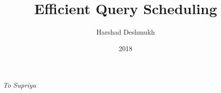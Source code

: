 
\clearpage{}  %

\title{Efficient Query Scheduling}
\author{Harshad Deshmukh}
\date{2018}

\maketitle

\copyrightpage

\begin{dedication}
    \emph{To Supriya}
\end{dedication}

\begin{acknowledgments}
    \singlespace
    
\end{acknowledgments}

\tableofcontents
\listoftables
\listoffigures





